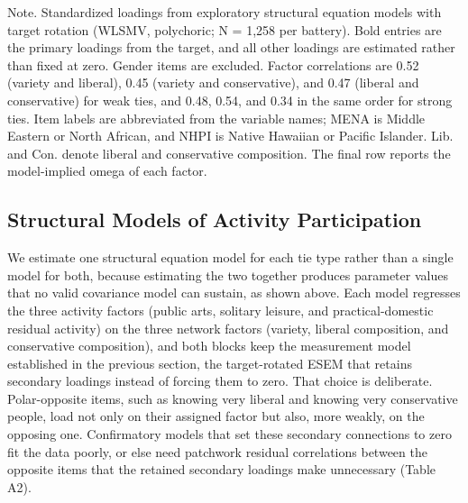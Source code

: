 \documentclass[
  12pt
]{article}
\begin{document}
Note. Standardized loadings from exploratory structural equation models with target rotation (WLSMV, polychoric; N = 1,258 per battery). Bold entries are the primary loadings from the target, and all other loadings are estimated rather than fixed at zero. Gender items are excluded. Factor correlations are 0.52 (variety and liberal), 0.45 (variety and conservative), and 0.47 (liberal and conservative) for weak ties, and 0.48, 0.54, and 0.34 in the same order for strong ties. Item labels are abbreviated from the variable names; MENA is Middle Eastern or North African, and NHPI is Native Hawaiian or Pacific Islander. Lib. and Con. denote liberal and conservative composition. The final row reports the model-implied omega of each factor.


\subsection{Structural Models of Activity Participation}\label{structural-models-of-activity-participation}

We estimate one structural equation model for each tie type rather than a single model for both, because estimating the two together produces parameter values that no valid covariance model can sustain, as shown above. Each model regresses the three activity factors (public arts, solitary leisure, and practical-domestic residual activity) on the three network factors (variety, liberal composition, and conservative composition), and both blocks keep the measurement model established in the previous section, the target-rotated ESEM that retains secondary loadings instead of forcing them to zero. That choice is deliberate. Polar-opposite items, such as knowing very liberal and knowing very conservative people, load not only on their assigned factor but also, more weakly, on the opposing one. Confirmatory models that set these secondary connections to zero fit the data poorly, or else need patchwork residual correlations between the opposite items that the retained secondary loadings make unnecessary (Table A2).
\end{document}
